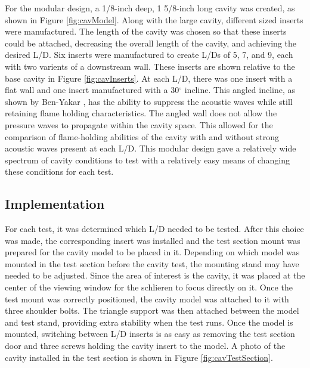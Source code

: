 For the modular design, a 1/8-inch deep, 1 5/8-inch long cavity was created, as shown in Figure \ref{fig:cavModel}. Along with the large cavity, different sized inserts were manufactured. The length of the cavity was chosen so that these inserts could be attached, decreasing the overall length of the cavity, and achieving the desired L/D. Six inserts were manufactured to create L/Ds of 5, 7, and 9, each with two varients of a downstream wall. These inserts are shown relative to the base cavity in Figure \ref{fig:cavInserts}. At each L/D, there was one insert with a flat wall and one insert manufactured with a 30$^\circ$ incline. This angled incline, as shown by Ben-Yakar \cite{ben2001cavity}, has the ability to suppress the acoustic waves while still retaining flame holding characteristics. The angled wall does not allow the pressure waves to propagate within the cavity space. This allowed for the comparison of flame-holding abilities of the cavity with and without strong acoustic waves present at each L/D. This modular design gave a relatively wide spectrum of cavity conditions to test with a relatively easy means of changing these conditions for each test. 

\subsection{Implementation}

For each test, it was determined which L/D needed to be tested. After this choice was made, the corresponding insert was installed and the test section mount was prepared for the cavity model to be placed in it. Depending on which model was mounted in the test section before the cavity test, the mounting stand may have needed to be adjusted.  Since the area of interest is the cavity, it was placed at the center of the viewing window for the schlieren to focus directly on it. Once the test mount was correctly positioned, the cavity model was attached to it with three shoulder bolts. The triangle support was then attached between the model and test stand, providing extra stability when the test runs. Once the model is mounted, switching between L/D inserts is as easy as removing the test section door and three screws holding the cavity insert to the model. A photo of the cavity installed in the test section is shown in Figure \ref{fig:cavTestSection}.



